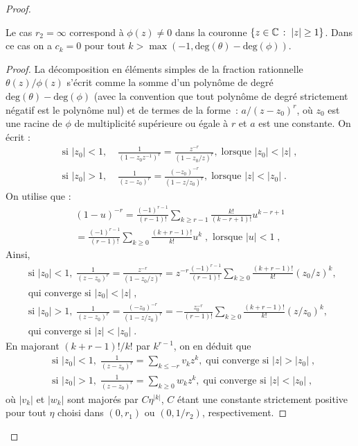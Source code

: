 \begin{proof}
\begin{lemma}
Le cas $r_2=\infty$ correspond \`a $\phi(z)\neq0$ dans la couronne $\left\{z \in \mathbb{C}\,:\; |z| \geq 1\right\}$. Dans ce cas on a $c_k=0$ pour tout $k>\max(-1,\mathrm{deg}(\theta)
- \mathrm{deg}(\phi))$.
\end{lemma}
\begin{proof}
  La d\'ecomposition en \'el\'ements simples de la fraction rationnelle
  $\theta(z)/\phi(z)$ s'\'ecrit comme la somme d'un polyn\^ome de degr\'e
  $\mathrm{deg}(\theta) - \mathrm{deg}(\phi)$ (avec la convention que tout
  polyn\^ome de degr\'e strictement n\'egatif est le polyn\^ome nul) et de termes de la forme~:
  $a/(z-z_0)^r$, o\`u $z_0$ est une racine de $\phi$ de multiplicit\'e sup\'erieure
  ou \'egale \`a $r$ et $a$ est une constante.  On \'ecrit :
\begin{align*}
\textrm{si }|z_0|<1,& \;
\frac{1}{(1-z_0 z^{-1})^r}=\frac{z^{-r}}{(1-z_0/z)^r},\;
\textrm{lorsque }|z_0|<|z|\;,\\
\textrm{si }|z_0|>1,& \;
\frac{1}{(z-z_0)^r}=\frac{(-z_0)^{-r}}{(1-z/z_0)^r},\;
\textrm{lorsque }|z|<|z_0|\;.
\end{align*}
On utilise que :
\begin{multline*}
(1-u)^{-r}=\frac{(-1)^{r-1}}{(r-1)!}\sum_{k\geq r-1}\frac{k!}{(k-r+1)!}
u^{k-r+1}\\
=\frac{(-1)^{r-1}}{(r-1)!}\sum_{k\geq 0}\frac{(k+r-1)!}{k!}
u^{k}\;,\textrm{ lorsque }|u|<1\;,
\end{multline*}
Ainsi,
\begin{align*}
&\textrm{si }|z_0|<1, \;
\frac{1}{(z-z_0)^r}=\frac{z^{-r}}{(1-z_0/z)^r}
=z^{-r}\frac{(-1)^{r-1}}{(r-1)!}\sum_{k\geq 0}\frac{(k+r-1)!}{k!}(z_0/z)^k,\; \\
&\textrm{qui converge si }|z_0|<|z|\;,\\
&\textrm{si }|z_0|>1, \;
\frac{1}{(z-z_0)^r}=\frac{(-z_0)^{-r}}{(1-z/z_0)^r}
=-\frac{z_0^{-r}}{(r-1)!}\sum_{k\geq 0}\frac{(k+r-1)!}{k!}
(z/z_0)^k,\; \\
&\textrm{qui converge si }|z|<|z_0|\;.
\end{align*}
En majorant $(k+r-1)!/k!$ par $k^{r-1}$, on en d\'eduit  que
\begin{align*}
&\textrm{si }|z_0|<1, \;
\frac{1}{(z-z_0)^r}=\sum_{k\leq -r} v_k z^k,\; \textrm{qui converge si }|z|>|z_0|\;,\\
&\textrm{si }|z_0|>1, \;
\frac{1}{(z-z_0)^r}=\sum_{k\geq 0} w_k z^k,\;\textrm{qui converge si }|z|<|z_0|\;,
\end{align*}
o\`u $|v_k|$ et $|w_k|$ sont major\'es par $C \eta^{|k|}$, $C$ \'etant une constante
strictement positive pour tout $\eta$ choisi dans
$(0,r_1)$ ou $(0,1/r_2)$, respectivement.


\end{proof}
\end{proof}
